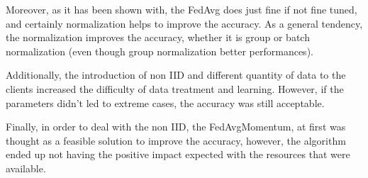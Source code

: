 \documentclass[twocolumn]{article}
\begin{document}
Moreover, as it has been shown with, the FedAvg does just fine if not fine tuned, and certainly normalization helps to improve the accuracy. As a general tendency, the normalization improves the  accuracy, whether it is group or batch normalization (even though group normalization better performances). 

Additionally, the introduction of non IID and different quantity of data to the clients increased the difficulty of data treatment and learning. However, if the parameters didn't led to extreme cases, the accuracy was still acceptable.

Finally, in order to deal with the non IID, the FedAvgMomentum, at first was thought as a feasible solution to improve the accuracy, however, the algorithm ended up not having the positive impact expected with the resources that were available.

\printbibliography
\end{document}
